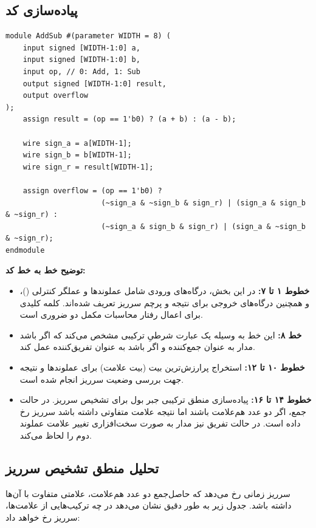 \documentclass[11pt,a4paper]{article}
\begin{document}
\subsection{پیاده‌سازی کد}
\begin{LTR}
\begin{lstlisting}[title={\rl{کد پیمانه جمع و تفریق}}]
module AddSub #(parameter WIDTH = 8) (
    input signed [WIDTH-1:0] a,
    input signed [WIDTH-1:0] b,
    input op, // 0: Add, 1: Sub
    output signed [WIDTH-1:0] result,
    output overflow
);
    assign result = (op == 1'b0) ? (a + b) : (a - b);
    
    wire sign_a = a[WIDTH-1];
    wire sign_b = b[WIDTH-1];
    wire sign_r = result[WIDTH-1];
    
    assign overflow = (op == 1'b0) ? 
                      (~sign_a & ~sign_b & sign_r) | (sign_a & sign_b & ~sign_r) :
                      (~sign_a & sign_b & sign_r) | (sign_a & ~sign_b & ~sign_r);
endmodule
\end{lstlisting}
\end{LTR}

\textbf{توضیح خط به خط کد:}
\begin{itemize}
    \item \textbf{خطوط ۱ تا ۷:} در این بخش، درگاه‌های ورودی شامل عملوندها و عملگر کنترلی ()، و همچنین درگاه‌های خروجی برای نتیجه و پرچم سرریز تعریف شده‌اند. کلمه کلیدی  برای اعمال رفتار محاسبات مکمل دو ضروری است.
    \item \textbf{خط ۸:} این خط به وسیله یک عبارت شرطیِ ترکیبی مشخص می‌کند که اگر  باشد مدار به عنوان جمع‌کننده و اگر  باشد به عنوان تفریق‌کننده عمل کند.
    \item \textbf{خطوط ۱۰ تا ۱۲:} استخراج پرارزش‌ترین بیت (بیت علامت) برای عملوندها و نتیجه جهت بررسی وضعیت سرریز انجام شده است.
    \item \textbf{خطوط ۱۴ تا ۱۶:} پیاده‌سازی منطق ترکیبی جبر بول برای تشخیص سرریز. در حالت جمع، اگر دو عدد هم‌علامت باشند اما نتیجه علامت متفاوتی داشته باشد سرریز رخ داده است. در حالت تفریق نیز مدار به صورت سخت‌افزاری تغییر علامت عملوند دوم را لحاظ می‌کند.
\end{itemize}

\subsection{تحلیل منطق تشخیص سرریز}
سرریز زمانی رخ می‌دهد که حاصل‌جمع دو عدد هم‌علامت، علامتی متفاوت با آن‌ها داشته باشد. جدول زیر به طور دقیق نشان می‌دهد در چه ترکیب‌هایی از علامت‌ها، سرریز رخ خواهد داد:
\end{document}
